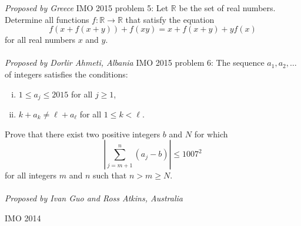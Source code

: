 \textit{Proposed by Greece} 
IMO 2015 problem 5:  Let $\mathbb R$ be the set of real numbers. Determine all functions $f:\mathbb R\to\mathbb R$ that satisfy the equation
\[ f(x+f(x+y))+f(xy)=x+f(x+y)+yf(x) \]
for all real numbers $x$ and $y$. \\\\
\textit{Proposed by Dorlir Ahmeti, Albania} 
IMO 2015 problem 6:  The sequence $a_1,a_2,\dots$ of integers satisfies the conditions:
\begin{enumerate}[(i)]
  \item $1\le a_j\le2015$ for all $j\ge1$,
  \item $k+a_k\neq \ell+a_\ell$ for all $1\le k<\ell$.
\end{enumerate}
Prove that there exist two positive integers $b$ and $N$ for which
\[ \left\vert\sum_{j=m+1}^n(a_j-b)\right\vert\le1007^2 \]
for all integers $m$ and $n$ such that $n>m\ge N$. \\\\
\textit{Proposed by Ivan Guo and Ross Atkins, Australia} 

IMO 2014 


